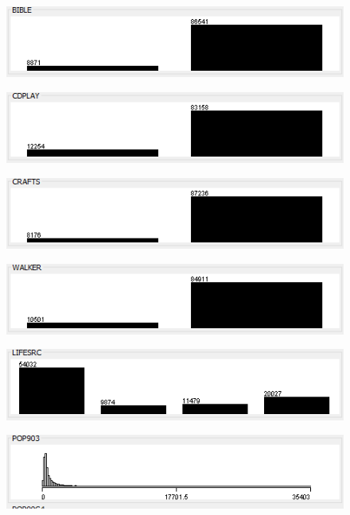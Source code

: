 \begin{figure}
\includegraphics{./images/expl_rep/Cattura2-01-04}
\end{figure}
\begin{figure}
\includegraphics{./images/expl_rep/Cattura2-01-05}
\end{figure}
\begin{figure}
\includegraphics{./images/expl_rep/Cattura2-01-06}
\end{figure}
\begin{figure}
\includegraphics{./images/expl_rep/Cattura2-01-07}
\end{figure}
\begin{figure}
\includegraphics{./images/expl_rep/Cattura2-01-08}
\end{figure}
\begin{figure}
\includegraphics{./images/expl_rep/Cattura2-01-09}
\end{figure}
